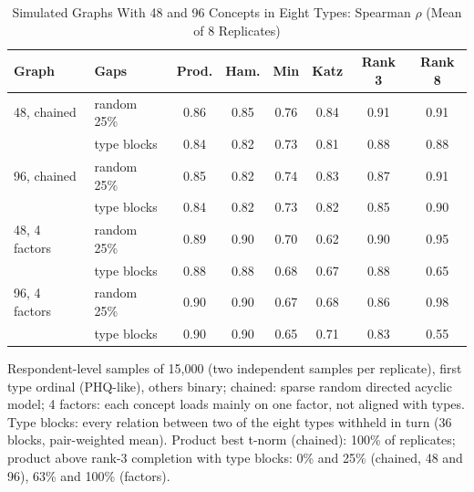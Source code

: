 \documentclass[journal]{IEEEtran}
\begin{document}
\setcounter{table}{19}\begin{table}[!t]
\caption{Simulated Graphs With 48 and 96 Concepts in Eight Types: Spearman $\rho$ (Mean of 8 Replicates)}
\centering
\scriptsize
\setlength{\tabcolsep}{2.5pt}
\begin{tabular}{@{}l l c c c c c c@{}}
\toprule
Graph & Gaps & Prod. & Ham. & Min & Katz & Rank 3 & Rank 8\\
\midrule
48, chained & random 25\% & 0.86 & 0.85 & 0.76 & 0.84 & 0.91 & 0.91\\
 & type blocks & 0.84 & 0.82 & 0.73 & 0.81 & 0.88 & 0.88\\
96, chained & random 25\% & 0.85 & 0.82 & 0.74 & 0.83 & 0.87 & 0.91\\
 & type blocks & 0.84 & 0.82 & 0.73 & 0.82 & 0.85 & 0.90\\
48, 4 factors & random 25\% & 0.89 & 0.90 & 0.70 & 0.62 & 0.90 & 0.95\\
 & type blocks & 0.88 & 0.88 & 0.68 & 0.67 & 0.88 & 0.65\\
96, 4 factors & random 25\% & 0.90 & 0.90 & 0.67 & 0.68 & 0.86 & 0.98\\
 & type blocks & 0.90 & 0.90 & 0.65 & 0.71 & 0.83 & 0.55\\
\bottomrule
\end{tabular}

\smallskip
\parbox{\columnwidth}{\scriptsize Respondent-level samples of 15,000 (two independent samples per replicate), first type ordinal (PHQ-like), others binary; chained: sparse random directed acyclic model; 4 factors: each concept loads mainly on one factor, not aligned with types. Type blocks: every relation between two of the eight types withheld in turn (36 blocks, pair-weighted mean). Product best t-norm (chained): 100\% of replicates; product above rank-3 completion with type blocks: 0\% and 25\% (chained, 48 and 96), 63\% and 100\% (factors).}
\end{table}
\end{document}
